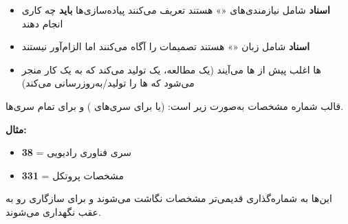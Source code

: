 \begin{itemize}
\tightlist
\item
  \textbf{اسناد } شامل نیازمندی‌های «» هستند  تعریف می‌کنند پیاده‌سازی‌ها \textbf{باید} چه کاری انجام دهند
\item
  \textbf{اسناد } شامل زبان «» هستند  تصمیمات را آگاه می‌کنند اما الزام‌آور نیستند
\item
  ها اغلب پیش از ها می‌آیند (یک مطالعه، یک  تولید می‌کند که به یک کار منجر می‌شود که ها را تولید/\allowbreak{}به‌روزرسانی می‌کند)
\end{itemize}



قالب شماره مشخصات به‌صورت زیر است:  (یا  برای سری‌های ) و  برای تمام سری‌ها.


\textbf{مثال:} 

\begin{itemize}
\tightlist
\item
  \textbf{38} = سری فناوری رادیویی 
\item
  \textbf{331} = مشخصات پروتکل 
\end{itemize}


این‌ها به شماره‌گذاری قدیمی‌تر مشخصات  نگاشت می‌شوند و برای سازگاری رو به عقب نگهداری می‌شوند.



